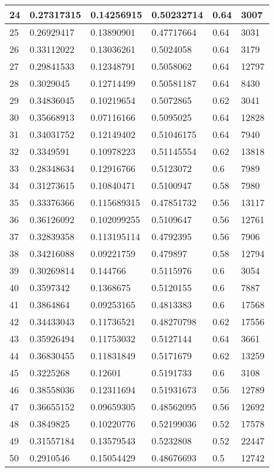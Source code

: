 \begin{longtable}{|l|l|l|l|l|l|}
24 & 0.27317315 & 0.14256915 & 0.50232714 & 0.64 & 3007 \\ \hline 
25 & 0.26929417 & 0.13890901 & 0.47717664 & 0.64 & 3031 \\ \hline 
26 & 0.33112022 & 0.13036261 & 0.5024058 & 0.64 & 3179 \\ \hline 
27 & 0.29841533 & 0.12348791 & 0.5058062 & 0.64 & 12797 \\ \hline 
28 & 0.3029045 & 0.12714499 & 0.50581187 & 0.64 & 8430 \\ \hline 
29 & 0.34836045 & 0.10219654 & 0.5072865 & 0.62 & 3041 \\ \hline 
30 & 0.35668913 & 0.07116166 & 0.5095025 & 0.64 & 12828 \\ \hline 
31 & 0.34031752 & 0.12149402 & 0.51046175 & 0.64 & 7940 \\ \hline 
32 & 0.3349591 & 0.10978223 & 0.51145554 & 0.62 & 13818 \\ \hline 
33 & 0.28348634 & 0.12916766 & 0.5123072 & 0.6 & 7989 \\ \hline 
34 & 0.31273615 & 0.10840471 & 0.5100947 & 0.58 & 7980 \\ \hline 
35 & 0.33376366 & 0.115689315 & 0.47851732 & 0.56 & 13117 \\ \hline 
36 & 0.36126092 & 0.102099255 & 0.5109647 & 0.56 & 12761 \\ \hline 
37 & 0.32839358 & 0.113195114 & 0.4792395 & 0.56 & 7906 \\ \hline 
38 & 0.34216088 & 0.09221759 & 0.479897 & 0.58 & 12794 \\ \hline 
39 & 0.30269814 & 0.144766 & 0.5115976 & 0.6 & 3054 \\ \hline 
40 & 0.3597342 & 0.1368675 & 0.5120155 & 0.6 & 7887 \\ \hline 
41 & 0.3864864 & 0.09253165 & 0.4813383 & 0.6 & 17568 \\ \hline 
42 & 0.34433043 & 0.11736521 & 0.48270798 & 0.62 & 17556 \\ \hline 
43 & 0.35926494 & 0.11753032 & 0.5127144 & 0.64 & 3661 \\ \hline 
44 & 0.36830455 & 0.11831849 & 0.5171679 & 0.62 & 13259 \\ \hline 
45 & 0.3225268 & 0.12601 & 0.5191733 & 0.6 & 3108 \\ \hline 
46 & 0.38558036 & 0.12311694 & 0.51931673 & 0.56 & 12789 \\ \hline 
47 & 0.36655152 & 0.09659305 & 0.48562095 & 0.56 & 12692 \\ \hline 
48 & 0.3849825 & 0.10220776 & 0.52199036 & 0.52 & 17578 \\ \hline 
49 & 0.31557184 & 0.13579543 & 0.5232808 & 0.52 & 22447 \\ \hline 
50 & 0.2910546 & 0.15054429 & 0.48676693 & 0.5 & 12742 \\ \hline 
\end{longtable}